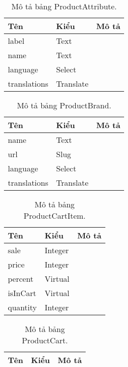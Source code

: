 \begin{table}[h!]
\begin{center}
\begin{tabular}{ |l|l|l| } 
	\hline
	Tên & Kiểu & Mô tả \\
	\hline
	label & Text & \dotfill \\
name & Text & \dotfill \\
language & Select & \dotfill \\
translations & Translate & \dotfill \\ 
	\hline
\end{tabular}
	\caption{Mô tả bảng ProductAttribute.}
	\label{table:ProductAttribute}
\end{center}
\end{table}


\begin{table}[h!]
\begin{center}
\begin{tabular}{ |l|l|l| } 
	\hline
	Tên & Kiểu & Mô tả \\
	\hline
	name & Text & \dotfill \\
url & Slug & \dotfill \\
language & Select & \dotfill \\
translations & Translate & \dotfill \\ 
	\hline
\end{tabular}
	\caption{Mô tả bảng ProductBrand.}
	\label{table:ProductBrand}
\end{center}
\end{table}


\begin{table}[h!]
\begin{center}
\begin{tabular}{ |l|l|l| } 
	\hline
	Tên & Kiểu & Mô tả \\
	\hline
	sale & Integer & \dotfill \\
price & Integer & \dotfill \\
percent & Virtual & \dotfill \\
isInCart & Virtual & \dotfill \\
quantity & Integer & \dotfill \\ 
	\hline
\end{tabular}
	\caption{Mô tả bảng ProductCartItem.}
	\label{table:ProductCartItem}
\end{center}
\end{table}


\begin{table}[h!]
\begin{center}
\begin{tabular}{ |l|l|l| } 
	\hline
	Tên & Kiểu & Mô tả \\
	\hline
	 
	\hline
\end{tabular}
	\caption{Mô tả bảng ProductCart.}
	\label{table:ProductCart}
\end{center}
\end{table}


